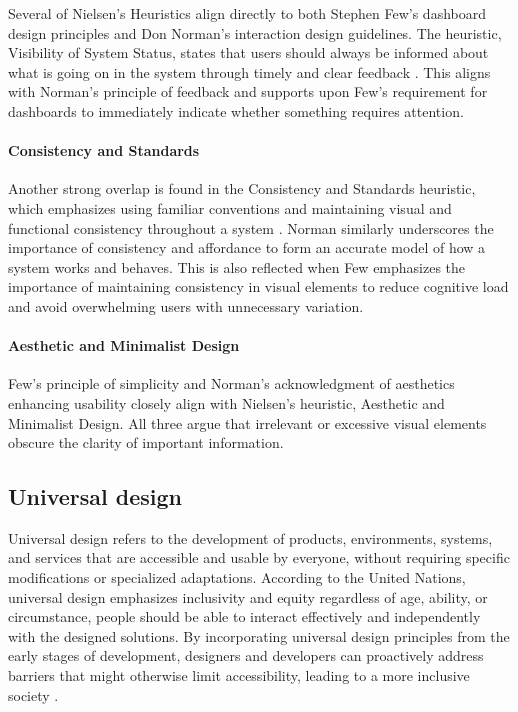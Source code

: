 Several of Nielsen's Heuristics align directly to both Stephen Few's dashboard design principles and Don Norman's interaction design guidelines. The heuristic, Visibility of System Status, states that users should always be informed about what is going on in the system through timely and clear feedback \autocite{Nielsen1994}. This aligns with Norman's principle of feedback and supports upon Few's requirement for dashboards to immediately indicate whether something requires attention.

\paragraph{Consistency and Standards}
\label{par:consistency_and_standards}


Another strong overlap is found in the Consistency and Standards heuristic, which emphasizes using familiar conventions and maintaining visual and functional consistency throughout a system \autocite{Nielsen1994}. Norman similarly underscores the importance of consistency and affordance to form an accurate model of how a system works and behaves. This is also reflected when Few emphasizes the importance of maintaining consistency in visual elements to reduce cognitive load and avoid overwhelming users with unnecessary variation. 

\paragraph{Aesthetic and Minimalist Design}
\label{par:aesthetic_and_minimalist_design}


Few's principle of simplicity and Norman's acknowledgment of aesthetics enhancing usability closely align with Nielsen's heuristic, Aesthetic and Minimalist Design. All three argue that irrelevant or excessive visual elements obscure the clarity of important information.

\subsection{Universal design}
\label{subsubsec:universal_design}


Universal design refers to the development of products, environments, systems, and services that are accessible and usable by everyone, without requiring specific modifications or specialized adaptations. According to the United Nations, universal design emphasizes inclusivity and equity regardless of age, ability, or circumstance, people should be able to interact effectively and independently with the designed solutions. By incorporating universal design principles from the early stages of development, designers and developers can proactively address barriers that might otherwise limit accessibility, leading to a more inclusive society \autocite{UN}.

